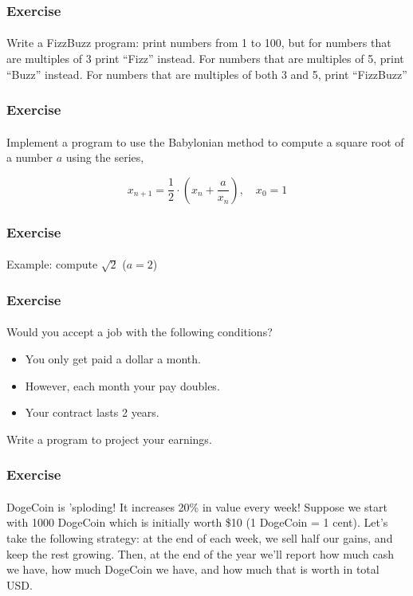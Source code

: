 \documentclass[]{beamer}
\begin{document}
\begin{frame}[fragile]
  \frametitle{Exercise}
  \framesubtitle{}

Write a FizzBuzz program: print numbers from 1 to 100, but for numbers
that are multiples of 3 print ``Fizz'' instead.  For numbers that are
multiples of 5, print ``Buzz'' instead.  For numbers that are multiples
of both 3 and 5, print ``FizzBuzz''

\end{frame}

\begin{frame}[fragile]
  \frametitle{Exercise}
  \framesubtitle{}

Implement a program to use the Babylonian method to compute a square 
root of a number $a$ using the series,

$$x_{n+1} = \frac{1}{2} \cdot \left(x_n + \frac{a}{x_n} \right), \quad x_0 = 1$$

\end{frame}

\begin{frame}[fragile]
  \frametitle{Exercise}
  \framesubtitle{}

Example: compute $\sqrt{2}$ ($a = 2$)

\end{frame}

\begin{frame}[fragile]
  \frametitle{Exercise}
  \framesubtitle{}

Would you accept a job with the following conditions?

\begin{itemize}
  \item You only get paid a dollar a month.
  \item However, each month your pay doubles.
  \item Your contract lasts 2 years.
\end{itemize}

Write a program to project your earnings.
\end{frame}

\begin{frame}[fragile]
  \frametitle{Exercise}
  \framesubtitle{}

DogeCoin is 'sploding!  It increases 20\% in value 
every week!  Suppose we start with 1000 DogeCoin
which is initially worth \$10 (1 DogeCoin = 1 cent).
Let's take the following strategy: at the end of
each week, we sell half our gains, and keep the rest
growing.  Then, at the end of the year we'll report
how much cash we have, how much DogeCoin we have, and
how much that is worth in total USD.

\end{frame}
\end{document}
